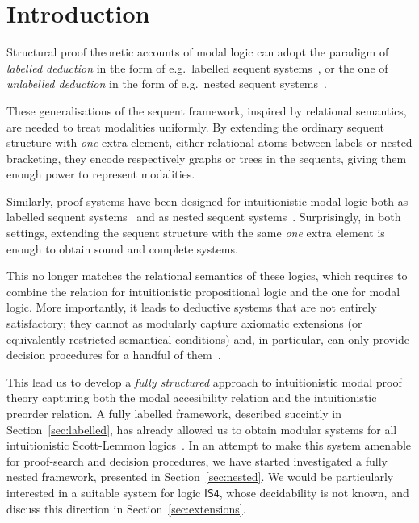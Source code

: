 \documentclass[twoside]{aiml20}
\begin{document}
\section{Introduction}

Structural proof theoretic accounts of modal logic can adopt the paradigm of \emph{labelled deduction} in the form of e.g.~labelled sequent systems~\cite{vigano2000,negri2005}, or the one of \emph{unlabelled deduction} in the form of e.g.~nested sequent systems~\cite{brunnler2009deep,poggiolesi2009method}.

These generalisations of the sequent framework, inspired by relational semantics, are needed to treat modalities uniformly. 
%
By extending the ordinary sequent structure with \emph{one} extra element, either relational atoms between labels or nested bracketing, they encode respectively graphs or trees in the sequents, giving them enough power to represent modalities. 

Similarly, proof systems have been designed for intuitionistic modal logic both as labelled sequent systems~\cite{simpson1994} and as nested sequent systems~\cite{strassburger2013,kuznets:strassburger:maehara}.
%
Surprisingly, in both settings, extending the sequent structure with the same \emph{one} extra element is enough to obtain sound and complete systems.

This no longer matches the relational semantics of these logics, which requires to combine the relation for intuitionistic propositional logic and the one for modal logic. 
%
More importantly, it leads to deductive systems that are not entirely satisfactory; they cannot as modularly capture axiomatic extensions (or equivalently restricted semantical conditions) and, in particular, can only provide decision procedures for a handful of them~\cite{simpson1994}.

This lead us to develop a \emph{fully structured} approach to intuitionistic modal proof theory capturing both the modal accesibility relation and the intuitionistic preorder relation. 
%
A fully labelled framework, described succintly in Section~\ref{sec:labelled}, has already allowed us to obtain modular systems for all intuitionistic Scott-Lemmon logics~\cite{marin:morales:strassburger:hal}. 
%
In an attempt to make this system amenable for proof-search and decision procedures, we have started investigated a fully nested framework, presented in Section~\ref{sec:nested}.
%
We would be particularly interested in a suitable system for logic $\mathsf{IS4}$, whose decidability is not known, and discuss this direction in Section~\ref{sec:extensions}.
\end{document}
